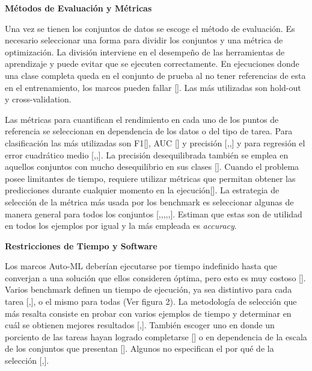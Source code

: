 \begin{flushleft} 
    {\large { \textbf{Métodos de Evaluación y Métricas}}}\label{subsection:met Auto-ML}
\end{flushleft}
Una vez se tienen los conjuntos de datos se escoge el método de evaluación. Es necesario seleccionar una forma para dividir los conjuntos y una métrica de optimización. 
La división interviene en el desempeño de las herramientas de aprendizaje y puede evitar que se ejecuten correctamente.
En ejecuciones donde una clase completa queda en el conjunto de prueba al no tener referencias de esta en el entrenamiento, los marcos pueden fallar [\cite{10}]. 
Las más utilizadas son hold-out y cross-validation.

Las métricas para cuantifican el rendimiento en cada uno de los puntos de referencia se seleccionan en dependencia de los datos o del tipo de tarea. Para clasificación 
las más utilizadas son F1[\cite{10}], AUC [\cite{15}] y precisión [\cite{16},\cite{19},\cite{24}] y para regresión el error cuadrático medio 
[\cite{10},\cite{16},\cite{19}]. La precisión desequilibrada también se emplea en aquellos conjuntos con mucho desequilibrio en sus clases [\cite{32}]. Cuando el 
problema posee limitantes de tiempo, requiere utilizar métricas que permitan obtener las predicciones durante cualquier momento en la ejecución[\cite{29}]. La 
estrategia de selección de la métrica más usada por los benchmark es seleccionar algunas de manera general 
para todos los conjuntos [\cite{8},\cite{9},\cite{13},\cite{20},\cite{22},\cite{26}]. Estiman que estas son de utilidad en todos los ejemplos por igual y 
la más empleada es \textit{accuracy}.

\begin{flushleft} 
    {\large { \textbf{Restricciones de Tiempo y Software}}}\label{subsection:tiempo Auto-ML}
\end{flushleft}

Los marcos Auto-ML deberían ejecutarse por tiempo indefinido hasta que converjan a una solución que ellos consideren óptima, pero esto es muy costoso [\cite{16}]. 
Varios benchmark definen un tiempo de ejecución, ya sea distintivo para cada tarea [\cite{11},\cite{29}], o el mismo para todas (Ver figura 2). La metodología de 
selección que más resalta consiste en probar con varios ejemplos de tiempo y determinar en cuál se obtienen mejores resultados [\cite{15},\cite{31}]. También escoger uno en 
donde un porciento de las tareas hayan logrado completarse [\cite{16}] o en dependencia de la escala de los conjuntos que presentan [\cite{23}]. Algunos no 
especifican el por qué de la selección [\cite{14},\cite{22}]. 

